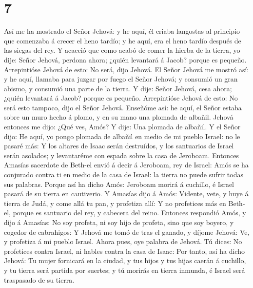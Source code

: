 \hypertarget{section-6}{%
\section{7}\label{section-6}}

 Así me ha mostrado el Señor Jehová: y he aquí, él criaba
langostas al principio que comenzaba á crecer el heno tardío; y he aquí,
era el heno tardío después de las siegas del rey.  Y acaeció
que como acabó de comer la hierba de la tierra, yo dije: Señor Jehová,
perdona ahora; ¿quién levantará á Jacob? porque es pequeño. 
Arrepintióse Jehová de esto: No será, dijo Jehová.  El Señor
Jehová me mostró así: y he aquí, llamaba para juzgar por fuego el Señor
Jehová; y consumió un gran abismo, y consumió una parte de la tierra.
 Y dije: Señor Jehová, cesa ahora; ¿quién levantará á Jacob?
porque es pequeño.  Arrepintióse Jehová de esto: No será
esto tampoco, dijo el Señor Jehová.  Enseñóme así: he aquí,
el Señor estaba sobre un muro hecho á plomo, y en su mano una plomada de
albañil.  Jehová entonces me dijo: ¿Qué ves, Amós? Y dije:
Una plomada de albañil. Y el Señor dijo: He aquí, yo pongo plomada de
albañil en medio de mi pueblo Israel: no le pasaré más:  Y
los altares de Isaac serán destruídos, y los santuarios de Israel serán
asolados; y levantaréme con espada sobre la casa de Jeroboam.
 Entonces Amasías sacerdote de Beth-el envió á decir á
Jeroboam, rey de Israel: Amós se ha conjurado contra ti en medio de la
casa de Israel: la tierra no puede sufrir todas sus palabras.
 Porque así ha dicho Amós: Jeroboam morirá á cuchillo, é
Israel pasará de su tierra en cautiverio.  Y Amasías dijo á
Amós: Vidente, vete, y huye á tierra de Judá, y come allá tu pan, y
profetiza allí:  Y no profetices más en Beth-el, porque es
santuario del rey, y cabecera del reino.  Entonces
respondió Amós, y dijo á Amasías: No soy profeta, ni soy hijo de
profeta, sino que soy boyero, y cogedor de cabrahigos:  Y
Jehová me tomó de tras el ganado, y díjome Jehová: Ve, y profetiza á mi
pueblo Israel.  Ahora pues, oye palabra de Jehová. Tú
dices: No profetices contra Israel, ni hables contra la casa de Isaac:
 Por tanto, así ha dicho Jehová: Tu mujer fornicará en la
ciudad, y tus hijos y tus hijas caerán á cuchillo, y tu tierra será
partida por suertes; y tú morirás en tierra inmunda, é Israel será
traspasado de su tierra.

